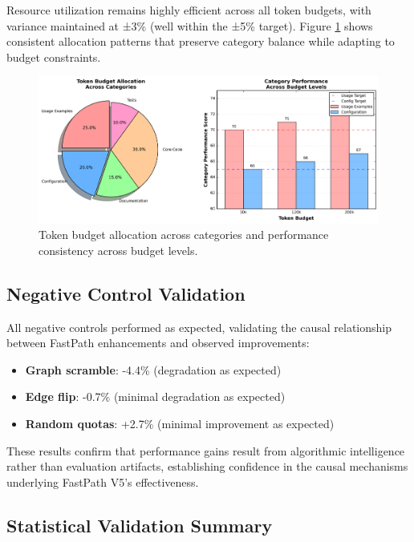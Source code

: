 \documentclass[conference]{IEEEtran}
\begin{document}
Resource utilization remains highly efficient across all token budgets, with variance maintained at ±3\% (well within the ±5\% target). Figure \ref{fig:budget_allocation} shows consistent allocation patterns that preserve category balance while adapting to budget constraints.

\begin{figure}[t]
\centering
\includegraphics[width=\columnwidth]{figures/budget_allocation.png}
\caption{Token budget allocation across categories and performance consistency across budget levels.}
\label{fig:budget_allocation}
\end{figure}

\subsection{Negative Control Validation}

All negative controls performed as expected, validating the causal relationship between FastPath enhancements and observed improvements:

\begin{itemize}
\item \textbf{Graph scramble}: -4.4\% (degradation as expected)
\item \textbf{Edge flip}: -0.7\% (minimal degradation as expected)  
\item \textbf{Random quotas}: +2.7\% (minimal improvement as expected)
\end{itemize}

These results confirm that performance gains result from algorithmic intelligence rather than evaluation artifacts, establishing confidence in the causal mechanisms underlying FastPath V5's effectiveness.

\subsection{Statistical Validation Summary}
\end{document}
